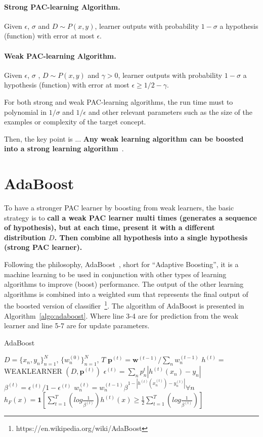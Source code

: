 \documentclass[11pt]{article}
\begin{document}
\paragraph{Strong PAC-learning Algorithm.} Given $\epsilon$, $\sigma$ and $D \sim P(x,y)$, learner outputs with probability $1-\sigma$ a hypothesis (function) with error at most $\epsilon$.

\paragraph{Weak PAC-learning Algorithm.} Given $\epsilon$, $\sigma$ , $D \sim P(x,y)$ and $\gamma > 0$, learner outputs with probability $1-\sigma$ a hypothesis (function) with error at most $\epsilon \ge 1/2 - \gamma$.

For both strong and weak PAC-learning algorithms, the run time must to polynomial in $1/\sigma$ and $1/\epsilon$ and other relevant parameters such as the size of the examples or complexity of the target concept. 

Then, the key point is ... \textbf{Any weak learning algorithm can be boosted into a strong learning algorithm}~\cite{schapire1990strength}.


\section{AdaBoost}
To have a stronger PAC learner by boosting from weak learners, the basic strategy is to \textbf{call a weak PAC learner multi times (generates a sequence of hypothesis), but at each time, present it with a different distribution $D$. Then combine all hypothesis into a single hypothesis (strong PAC learner).}

Following the philosophy, AdaBoost~\cite{freund1997decision}, short for ``Adaptive Boosting'', it is a machine learning to be used in conjunction with other types of learning algorithms to improve (boost) performance. The output of the other learning algorithms is combined into a weighted sum that represents the final output of the boosted version of classifier~\footnote{https://en.wikipedia.org/wiki/AdaBoost}. The algorithm of AdaBoost is presented in Algorithm~\ref{algo:adaboost}. Where line 3-4 are for prediction from the weak learner and line 5-7 are for update parameters.

\begin{algorithm}[H]
\caption{AdaBoost}
\label{algo:adaboost}
\begin{algorithmic}[1]
\REQUIRE $D=\{x_n, y_n\}_{n=1}^N$, $\{w_n^{(0)}\}_{n=1}^N$, $T$
\STATE $\mathbf{p}^{(t)} = \mathbf{w}^{(t-1)} / \sum_{n} w_n^{(t-1)}$
\STATE $h^{(t)} = $ WEAKLEARNER $(D, \mathbf{p}^{(t)})$
\STATE $\epsilon^{(t)} = \sum_n p_n^t | h^{(t)} (x_n) - y_n | $
\STATE $\beta^{(t)} = \epsilon^{(t)} / 1 - \epsilon^{(t)}$
\STATE $w_n^{(t)} = w_n^{(t-1)} \beta^{1 - |h^{(t)} (x_n^{(t)}) -y_n^{(t)} |} \forall n$
\ENDFOR
\STATE $h_F(x) = \mathbf{1}[\sum_{t=1}^T (log \frac{1}{\beta^{(t)}}) h^{(t)} (x) \ge \frac{1}{2} \sum_{t=1}^T (log \frac{1}{\beta^{(t)}})]$
\end{algorithmic}
\end{algorithm}
\end{document}
